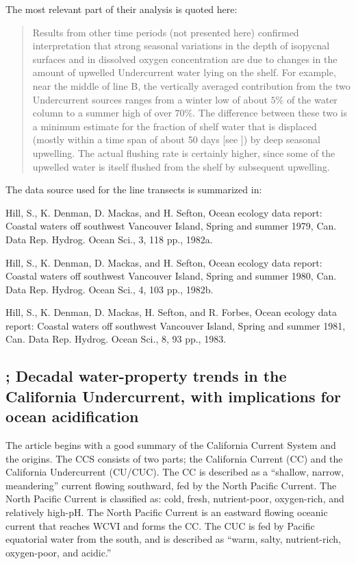 \documentclass[12pt]{extreport}
\begin{document}
The most relevant part of their analysis is quoted here:
\begin{quote}
Results from other time periods (not presented here) confirmed \cite{freeland1982topographically} interpretation that strong seasonal variations in the depth of isopycnal surfaces and in dissolved oxygen concentration are due to changes in the amount of upwelled Undercurrent water lying on the shelf. For example, near the middle of line B, the vertically averaged contribution from the two Undercurrent sources ranges from a winter low of about $5\%$ of the water column to a summer high of over $70\%$. The difference between these two is a minimum estimate for the fraction of shelf water that is displaced (mostly within a time span of about 50 days [see \cite{freeland1982topographically}]) by deep seasonal upwelling. The actual flushing rate is certainly higher, since some of the upwelled water is itself flushed from the shelf by subsequent upwelling.
\end{quote}

The data source used for the line transects is summarized in:

\noindent Hill, S., K. Denman, D. Mackas, and H. Sefton, Ocean ecology data report: Coastal waters off southwest Vancouver Island, Spring and summer 1979, Can. Data Rep. Hydrog. Ocean Sci., 3, 118 pp., 1982a.

\noindent Hill, S., K. Denman, D. Mackas, and H. Sefton, Ocean ecology data report: Coastal waters off southwest Vancouver Island, Spring and summer 1980, Can. Data Rep. Hydrog. Ocean Sci., 4, 103 pp., 1982b.

\noindent Hill, S., K. Denman, D. Mackas, H. Sefton, and R. Forbes, Ocean ecology data report: Coastal waters off southwest Vancouver Island, Spring and summer 1981, Can. Data Rep. Hydrog. Ocean Sci., 8, 93 pp., 1983.

\subsection{\cite{meinvielle2013decadal}; Decadal water-property trends in the California Undercurrent, with implications for ocean acidification}

The article begins with a good summary of the California Current System and the origins. The CCS consists of two parts; the California Current (CC) and the California Undercurrent (CU/CUC). The CC is described as a ``shallow, narrow, meandering'' current flowing southward, fed by the North Pacific Current. The North Pacific Current is classified as: cold, fresh, nutrient-poor, oxygen-rich, and relatively high-pH. The North Pacific Current is an eastward flowing oceanic current that reaches WCVI and forms the CC. The CUC is fed by Pacific equatorial water from the south, and is described as ``warm, salty, nutrient-rich, oxygen-poor, and acidic.''
\end{document}
